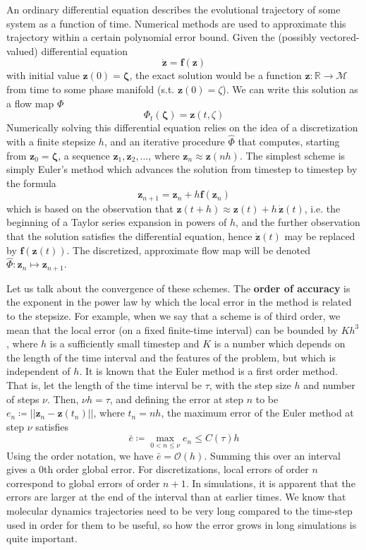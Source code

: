 \documentclass{article}
\theoremstyle{remark}
\theoremstyle{definition}
\begin{document}
An ordinary differential equation describes the evolutional trajectory of some system as a function of time. Numerical methods are used to approximate this trajectory within a certain polynomial error bound. Given the (possibly vectored-valued) differential equation 
\[\mathbf{\dot{z}} = \mathbf{f}(\mathbf{z})\]
with initial value $\mathbf{z}(0) = \boldsymbol{\zeta}$, the exact solution would be a function $\mathbf{z}: \mathbb{R} \longrightarrow \mathcal{M}$ from time to some phase manifold (s.t. $\mathbf{z}(0) = \zeta$). We can write this solution as a flow map $\Phi$
\[\Phi_t (\boldsymbol{\zeta}) = \mathbf{z}(t, \zeta)\]
Numerically solving this differential equation relies on the idea of a discretization with a finite stepsize $h$, and an iterative procedure $\hat{\Phi}$ that computes, starting from $\mathbf{z}_0 = \boldsymbol{\zeta}$, a sequence $\mathbf{z}_1, \mathbf{z}_2, \ldots$, where $\mathbf{z}_n \approx \mathbf{z}(n h)$. The simplest scheme is simply Euler's method which advances the solution from timestep to timestep by the formula 
\[\mathbf{z}_{n+1} = \mathbf{z}_n + h \mathbf{f}(\mathbf{z}_n)\]
which is based on the observation that $\mathbf{z}(t + h) \approx \mathbf{z}(t) + h\, \boldsymbol{\dot{z}}(t)$, i.e. the beginning of a Taylor series expansion in powers of $h$, and the further observation that the solution satisfies the differential equation, hence $\boldsymbol{\dot{z}}(t)$ may be replaced by $\mathbf{f}(\mathbf{z}(t))$. The discretized, approximate flow map will be denoted $\hat{\Phi}: \mathbf{z}_n \mapsto \mathbf{z}_{n+1}$. 

Let us talk about the convergence of these schemes. The \textbf{order of accuracy} is the exponent in the power law by which the local error in the method is related to the stepsize. For example, when we say that a scheme is of third order, we mean that the local error (on a fixed finite-time interval) can be bounded by $K h^3$, where $h$ is a sufficiently small timestep and $K$ is a number which depends on the length of the time interval and the features of the problem, but which is independent of $h$. It is known that the Euler method is a first order method. That is, let the length of the time interval be $\tau$, with the step size $h$ and number of steps $\nu$. Then, $\nu h = \tau$, and defining the error at step $n$ to be $e_n \coloneqq ||\mathbf{z}_n - \mathbf{z}(t_n)||$, where $t_n = n h$, the maximum error of the Euler method at step $\nu$ satisfies
\[\bar{e} \coloneqq \max_{0 < n \leq \nu} e_n \leq C(\tau) h \]
Using the order notation, we have $\bar{e} = \mathcal{O}(h)$. Summing this over an interval gives a $0$th order global error. For discretizations, local errors of order $n$ correspond to global errors of order $n+1$. In simulations, it is apparent that the errors are larger at the end of the interval than at earlier times. We know that molecular dynamics trajectories need to be very long compared to the time-step used in order for them to be useful, so how the error grows in long simulations is quite important. 
\end{document}

